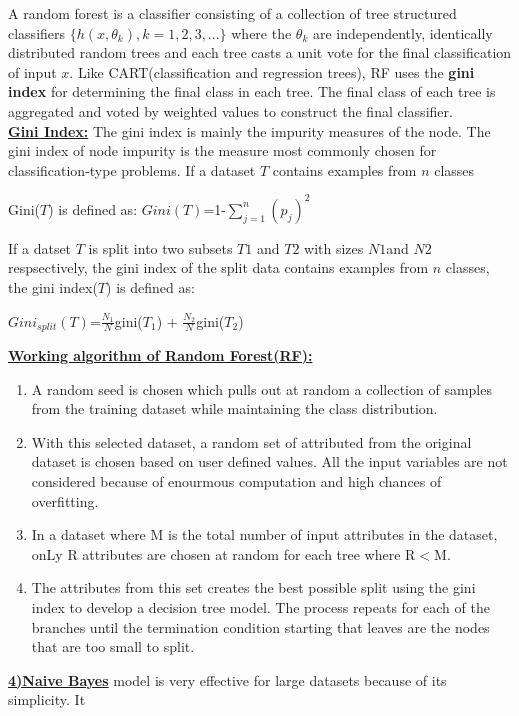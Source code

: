 \documentclass[11pt]{article}
\begin{document}
A random forest is a classifier consisting of a collection of tree structured classifiers $\{h(x,\theta_{k}),k=1,2,3,...\}$ where the $\theta_{k}$ are independently, identically distributed random trees and each tree casts a unit vote for the final classification of input $x$. Like CART(classification and regression trees), RF uses the \textbf{gini index } for determining the final class in each tree. The final class of each tree is aggregated and voted by weighted values to construct the final classifier.\\
\underline{\textbf{Gini Index:}} The gini index is mainly the impurity measures of the node. The gini index of node impurity is the measure most commonly chosen for classification-type problems. If a dataset $T$ contains  examples from $n$ classes
\begin{center}
Gini($T$) is defined as:
$Gini(T)$=1-$\sum\limits_{j=1}^{n}(p_{j})^{2}$
\end{center}
If a datset $T$ is split into two subsets $T1$ and $T2$ with sizes $N1$and $N2$ respsectively, the gini index of the split data contains examples from $n$ classes, the gini index($T$) is defined as:
\begin{center}
$Gini_{split}(T)$=$\displaystyle\frac{N_{1}}{N}$gini($T_{1}$) + $\displaystyle\frac{N_{2}}{N}$gini($T_{2}$)

\end{center}
\underline{\textbf{Working algorithm of Random Forest(RF):}}
\begin{enumerate}[1.]
\item A random seed is chosen which pulls out at random a collection of samples from the training dataset while maintaining the class distribution.
\item With this selected dataset, a random set of attributed from the original dataset is chosen based on user defined values. All the input variables are not considered because of enourmous computation and high chances of overfitting.
\item In a dataset where M is the total number of input attributes in the dataset, onLy R attributes are chosen at random for each tree where R$<$M.
\item The attributes from this set creates the best possible split using the gini index to develop a decision tree model. The process repeats for each of the branches until the termination condition starting that leaves are the nodes that are too small to split.
\end{enumerate}
\underline{\textbf{4)Naive Bayes}} model is very effective for large datasets because of its simplicity. It
\end{document}
